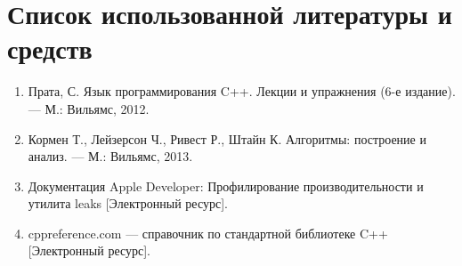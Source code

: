 \section{Список использованной литературы и средств}

\begin{enumerate}
    \item Прата, С. Язык программирования C++. Лекции и упражнения (6-е издание). — М.: Вильямс, 2012.
    \item Кормен Т., Лейзерсон Ч., Ривест Р., Штайн К. Алгоритмы: построение и анализ. — М.: Вильямс, 2013.
    \item Документация Apple Developer: Профилирование производительности и утилита leaks [Электронный ресурс].
    \item cppreference.com — справочник по стандартной библиотеке C++ [Электронный ресурс].
\end{enumerate}